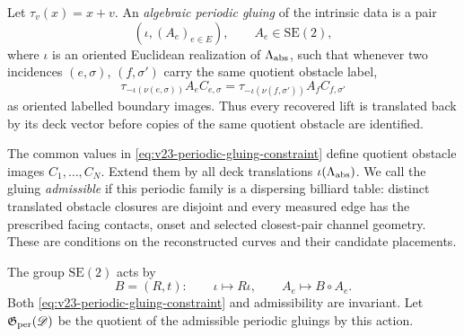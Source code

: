 Let \(\tau_v(x)=x+v\).  An \emph{algebraic periodic gluing} of the intrinsic
data is a pair
\begin{equation}\label{eq:v23-periodic-gluing}
 \left(\iota,(A_e)_{e\in E}\right),
 \qquad
 A_e\in\mathrm{SE}(2),
\end{equation}
where \(\iota\) is an oriented Euclidean realization of
\(\Lambda_{\rm abs}\), such that whenever two incidences
\((e,\sigma)\), \((f,\sigma')\) carry the same quotient obstacle label,
\begin{equation}\label{eq:v23-periodic-gluing-constraint}
 \tau_{-\iota(\nu(e,\sigma))}A_eC_{e,\sigma}
 =
 \tau_{-\iota(\nu(f,\sigma'))}A_fC_{f,\sigma'}
\end{equation}
as oriented labelled boundary images.  Thus every recovered lift is translated
back by its deck vector before copies of the same quotient obstacle are
identified.

The common values in \eqref{eq:v23-periodic-gluing-constraint} define quotient
obstacle images \(C_1,\ldots,C_N\).  Extend them by all deck translations
\(\iota(\Lambda_{\rm abs})\).  We call the gluing \emph{admissible} if this
periodic family is a dispersing billiard table: distinct translated obstacle
closures are disjoint and every measured edge has the prescribed facing
contacts, onset and selected closest-pair channel geometry.  These are
conditions on the reconstructed curves and their candidate placements.

The group \(\mathrm{SE}(2)\) acts by
\[
 B=(R,t):\qquad
 \iota\mapsto R\iota,
 \qquad A_e\mapsto B\circ A_e.
\]
Both \eqref{eq:v23-periodic-gluing-constraint} and admissibility are invariant.
Let \(\mathfrak G_{\rm per}(\mathscr D)\) be the quotient of the admissible
periodic gluings by this action.

